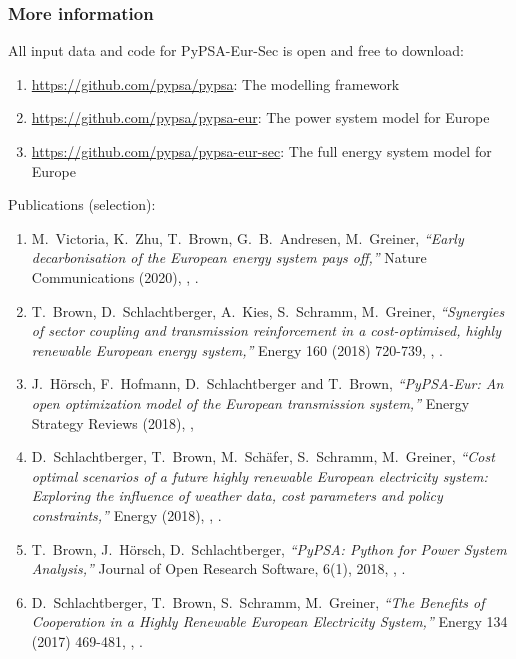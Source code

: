\begin{frame}
  \frametitle{More information}

  All input data and code for PyPSA-Eur-Sec is open and free to download:
  \begin{enumerate}
  \item \url{https://github.com/pypsa/pypsa}: The modelling framework
  \item \url{https://github.com/pypsa/pypsa-eur}: The power system model for Europe
  \item \url{https://github.com/pypsa/pypsa-eur-sec}: The full energy system model for Europe
  \end{enumerate}

  \vspace{.3cm}

  Publications (selection):
  {\tiny
    \begin{enumerate}
      \item M.~Victoria, K.~Zhu, T.~Brown, G.~B.~Andresen, M.~Greiner, \emph{``Early decarbonisation of the European energy system pays off,''} Nature Communications (2020),  , .
  \item T.~Brown, D.~Schlachtberger, A.~Kies, S.~Schramm, M.~Greiner, \emph{``Synergies of sector coupling and transmission reinforcement in a cost-optimised, highly renewable European energy system,''} Energy 160 (2018) 720-739, , .
  \item J.~Hörsch, F.~Hofmann, D.~Schlachtberger and T.~Brown, \emph{``PyPSA-Eur: An open optimization model of the
    European transmission system,''} Energy Strategy Reviews (2018), , 
  \item D.~Schlachtberger, T.~Brown, M.~Schäfer, S.~Schramm, M.~Greiner, \emph{``Cost optimal scenarios of a future highly renewable European electricity system: Exploring the influence of weather data, cost parameters and policy constraints,''} Energy (2018), , .
\item T.~Brown, J.~Hörsch, D.~Schlachtberger, \emph{``PyPSA: Python for Power System Analysis,''}  Journal of Open Research Software, 6(1), 2018, , .
\item D.~Schlachtberger, T.~Brown, S.~Schramm, M.~Greiner, \emph{``The Benefits of Cooperation in a Highly Renewable European Electricity System,''} Energy 134 (2017) 469-481, , .
  \end{enumerate}
}
\end{frame}


